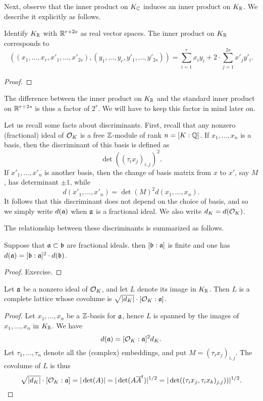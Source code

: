 Next, observe that the inner product on $K_{\mathbb{C}}$ induces an inner product on $K_{\mathbb{R}}$.
We describe it explicitly as follows.
\begin{lemma}
  Identify $K_{\mathbb{R}}$ with $\mathbb{R}^{r + 2s}$ as real vector spaces.
  The inner product on $K_{\mathbb{R}}$ corresponds to
  \[ ((x_{1},\ldots,x_{r},x'_{1},\ldots,x'_{2s}),(y_{1},\ldots,y_{r},y'_{1},\ldots,y'_{2s})) = \sum_{i = 1}^{r} x_{i} y_{i} + 2 \cdot \sum_{j = 1}^{2s} x'_{j} y'_{i}. \]
\end{lemma}
\begin{proof}
\end{proof}

The difference between the inner product on $K_{\mathbb{R}}$ and the standard inner product on $\mathbb{R}^{r + 2s}$ is thus a factor of $2^{s}$.
We will have to keep this factor in mind later on.

Let us recall some facts about discriminants.
First, recall that any nonzero (fractional) ideal of $\mathcal{O}_{K}$ is a free $\mathbb{Z}$-module of rank $n = [K:\mathbb{Q}]$.
If $x_{1},\ldots,x_{n}$ is a basis, then the discriminant of this basis is defined as
\[ \det((\tau_{i}x_{j})_{i,j})^{2}. \]
If $x'_{1},\ldots,x'_{n}$ is another basis, then the change of basis matrix from $x$ to $x'$, say $M$, has determinant $\pm 1$, while
\[ d(x'_{1},\ldots,x'_{n}) = \det(M)^{2} d(x_{1},\ldots,x_{n}). \]
It follows that this discriminant does not depend on the choice of basis, and so we simply write $d(\mathfrak{a})$ when $\mathfrak{a}$ is a fractional ideal.
We also write $d_{K} = d(\mathcal{O}_{K})$.

The relationship between these discriminants is summarized as follows.
\begin{lemma}
  Suppose that $\mathfrak{a} \subset \mathfrak{b}$ are fractional ideals.
  then $[\mathfrak{b}:\mathfrak{a}]$ is finite and one has $d(\mathfrak{a}) = [\mathfrak{b} : \mathfrak{a}]^{2} \cdot d(\mathfrak{b})$.
\end{lemma}
\begin{proof}
  Exercise.
\end{proof}

\begin{proposition}\label{proposition:covolume_ideal_computation}
  Let $\mathfrak{a}$ be a nonzero ideal of $\mathcal{O}_{K}$, and let $L$ denote its image in $K_{\mathbb{R}}$.
  Then $L$ is a complete lattice whose covolume is $\sqrt{|d_{K}|} \cdot [\mathcal{O}_{K}:\mathfrak{a}]$.
\end{proposition}
\begin{proof}
  Let $x_{1},\ldots,x_{n}$ be a $\mathbb{Z}$-basis for $\mathfrak{a}$, hence $L$ is spanned by the images of $x_{1},\ldots,x_{n}$ in $K_{\mathbb{R}}$.
  We have
  \[ d(\mathfrak{a}) = [\mathcal{O}_{K}:\mathfrak{a}]^{2} d_{K}. \]
  Let $\tau_{1},\ldots,\tau_{n}$ denote all the (complex) embeddings, and put $M = (\tau_{i} x_{j})_{i,j}$.
  The covolume of $L$ is thus
  \[ \sqrt{|d_{K}|} \cdot [\mathcal{O}_{K}:\mathfrak{a}] = |\det(A)| = |\det(A \overline A^{t})|^{1/2} = |\det((\tau_{i}x_{j},\tau_{i}x_{k})_{j,j}))|^{1/2}. \]
\end{proof}

